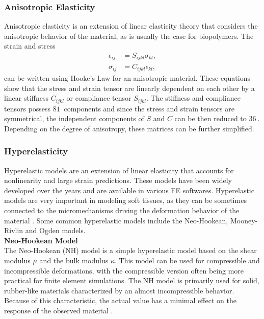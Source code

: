 \subsubsection*{Anisotropic Elasticity}
Anisotropic elasticity is an extension of linear elasticity theory that considers the anisotropic 
behavior of the material, as is usually the case for biopolymers. The strain and stress 
\begin{align}
        \epsilon_{ij} &= S_{ijkl} \sigma_{kl}, \label{eq:strainanisotropic}\\
        \sigma_{ij} &= C_{ijkl} \epsilon_{kl}, \label{eq:stressanisotropic}
\end{align}
can be written using Hooke's Law for an anisotropic material. These equations 
show that the stress and strain tensor are linearly dependent on each other by a linear stiffness $C_{ijkl}$ 
or compliance tensor $S_{ijkl}$. The stiffness and compliance tensors possess $\SI{81}{}$ components and 
since the stress and strain tensors are symmetrical, the independent components of $S$ and $C$ can be then reduced 
to $\SI{36}{}$. Depending on the degree of anisotropy, these matrices can be further simplified. 

\subsubsection*{Hyperelasticity}
Hyperelastic models are an extension of linear elasticity that accounts for nonlinearity 
and large strain predictions. These models have been widely developed over the years and 
are available in various FE softwares. Hyperelastic models are very important in modeling 
soft tissues, as they can be sometimes connected to the micromechanisms driving the 
deformation behavior of the material \cite{Bergström2015}. Some common hyperelastic models include the 
Neo-Hookean, Mooney-Rivlin and Ogden models.\\

\textbf{Neo-Hookean Model}\\

The Neo-Hookean (NH) model is a simple hyperelastic model based on the shear 
modulus $\mu$ and the bulk modulus $\kappa$. This model can be used for compressible 
and incompressible deformations, with the compressible version often being more 
practical for finite element simulations. The NH model is primarily used for 
solid, rubber-like materials characterized by an almost incompressible behavior. 
Because of this characteristic, the actual value has a minimal effect on the response 
of the observed material \cite{Bergström2015}.

